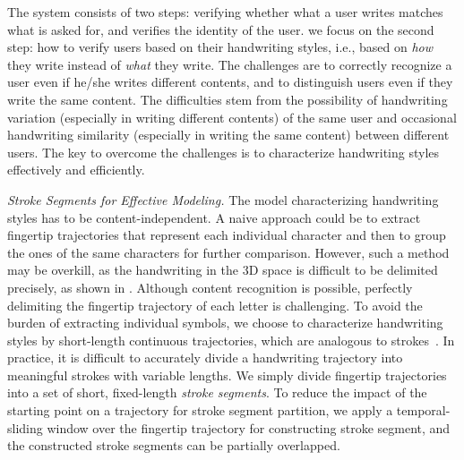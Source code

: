 The \CiT system consists of two steps: verifying whether what a user writes matches what is asked for, and verifies the identity of the user. 
 we focus on the second step: how to verify users based on their handwriting styles, i.e., based on \textit{how} they write instead of \textit{what} they write. The challenges are to correctly recognize a user even if he/she writes different contents, and to distinguish users even if they write the same content. The difficulties stem from the possibility of handwriting variation (especially in writing different contents) of the same user and occasional handwriting similarity (especially in writing the same content) between different users.  The key to overcome the challenges is to characterize handwriting styles effectively and efficiently. 

\emph{Stroke Segments for Effective Modeling.} The model characterizing handwriting styles has to be content-independent. A naive approach could be to extract fingertip trajectories that represent each individual character and then to group the ones of the same characters for further comparison. However, such a method may be overkill, as the handwriting in the 3D space is difficult to be delimited precisely, as shown in . 
Although content recognition is possible, perfectly delimiting the fingertip trajectory of each letter is challenging. To avoid the burden of extracting individual symbols, we choose to characterize handwriting styles 
by short-length continuous trajectories, which are analogous to strokes~\cite{Component94,word-seg-stroke}. In practice, it is difficult to accurately divide a handwriting trajectory into meaningful strokes with variable lengths. We simply divide fingertip trajectories into a set of short, fixed-length \emph{stroke segments}. To reduce the impact of the starting point on a trajectory for stroke segment partition, we apply a temporal-sliding window over the fingertip trajectory for constructing stroke segment, and the constructed stroke segments can be partially overlapped.


